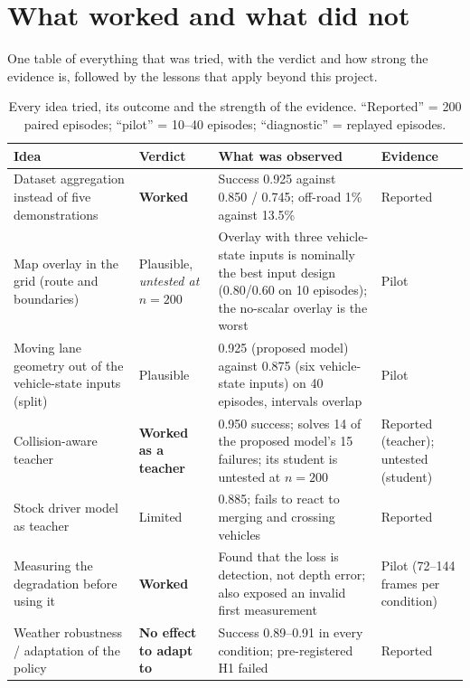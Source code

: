 \section{What worked and what did not}\label{sec:lessons}

\begin{plainwords}
One table of everything that was tried, with the verdict and how strong the evidence is, followed by the lessons that apply beyond this project.
\end{plainwords}


\begin{table}[H]\centering\small
\caption{Every idea tried, its outcome and the strength of the evidence. ``Reported'' = 200 paired episodes; ``pilot'' = 10--40 episodes; ``diagnostic'' = replayed episodes.}\label{tab:lessons}
\begin{tabularx}{\textwidth}{@{}>{\raggedright\arraybackslash}p{4.2cm}>{\raggedright\arraybackslash}p{1.9cm}X>{\raggedright\arraybackslash}p{1.9cm}@{}}\toprule
Idea & Verdict & What was observed & Evidence\\\midrule
Dataset aggregation instead of five demonstrations & \textbf{Worked} & Success 0.925 against 0.850 / 0.745; off-road 1\% against 13.5\% & Reported\\
Map overlay in the grid (route and boundaries) & Plausible, \emph{untested at $n=200$} & Overlay with three vehicle-state inputs is nominally the best input design (0.80/0.60 on 10 episodes); the no-scalar overlay is the worst & Pilot\\
Moving lane geometry out of the vehicle-state inputs (split) & Plausible & 0.925 (proposed model) against 0.875 (six vehicle-state inputs) on 40 episodes, intervals overlap & Pilot\\
Collision-aware teacher & \textbf{Worked as a teacher} & 0.950 success; solves 14 of the proposed model's 15 failures; its student is untested at $n=200$ & Reported (teacher); untested (student)\\
Stock driver model as teacher & Limited & 0.885; fails to react to merging and crossing vehicles & Reported\\
Measuring the degradation before using it & \textbf{Worked} & Found that the loss is detection, not depth error; also exposed an invalid first measurement & Pilot (72--144 frames per condition)\\
Weather robustness / adaptation of the policy & \textbf{No effect to adapt to} & Success 0.89--0.91 in every condition; pre-registered H1 failed & Reported\\

\end{tabularx}
\end{table}
